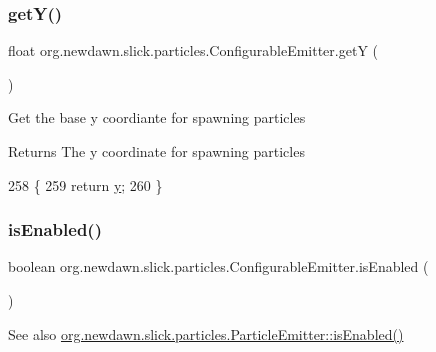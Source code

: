 \subsubsection{\texorpdfstring{get\+Y()}{getY()}}
{\footnotesize\ttfamily float org.\+newdawn.\+slick.\+particles.\+Configurable\+Emitter.\+getY (\begin{DoxyParamCaption}{ }\end{DoxyParamCaption})\hspace{0.3cm}{\ttfamily [inline]}}

Get the base y coordiante for spawning particles

\begin{DoxyReturn}{Returns}
The y coordinate for spawning particles 
\end{DoxyReturn}

\begin{DoxyCode}
258                         \{
259         \textcolor{keywordflow}{return} \mbox{\hyperlink{classorg_1_1newdawn_1_1slick_1_1particles_1_1_configurable_emitter_af1da7225bf1c489ad9a5323bf2a20ade}{y}};
260     \}
\end{DoxyCode}
\mbox{\label{classorg_1_1newdawn_1_1slick_1_1particles_1_1_configurable_emitter_a2e85f026589d4cd80c64dd3e983461fc}} 
\subsubsection{\texorpdfstring{is\+Enabled()}{isEnabled()}}
{\footnotesize\ttfamily boolean org.\+newdawn.\+slick.\+particles.\+Configurable\+Emitter.\+is\+Enabled (\begin{DoxyParamCaption}{ }\end{DoxyParamCaption})\hspace{0.3cm}{\ttfamily [inline]}}

\begin{DoxySeeAlso}{See also}
\mbox{\hyperlink{interfaceorg_1_1newdawn_1_1slick_1_1particles_1_1_particle_emitter_a6a6fabad4971a0634a0a99dbed53c47d}{org.\+newdawn.\+slick.\+particles.\+Particle\+Emitter\+::is\+Enabled()}} 
\end{DoxySeeAlso}


